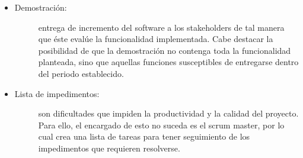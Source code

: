 \begin{itemize}
    \item   \begin{description}
                \item[Demostración:] entrega de incremento del software a los stakeholders de tal manera que éste evalúe la funcionalidad implementada. Cabe destacar la posibilidad de que la demostración no contenga toda la funcionalidad planteada, sino que aquellas funciones susceptibles de entregarse dentro del periodo establecido.
            \end{description}
    
    \item   \begin{description}
                \item[Lista de impedimentos: ]  son dificultades que impiden la productividad y la calidad del proyecto. Para ello, el encargado de esto no suceda es el scrum master, por lo cual crea una lista de tareas para tener seguimiento de los impedimentos que requieren resolverse. 
        
            \end{description}
\end{itemize}

